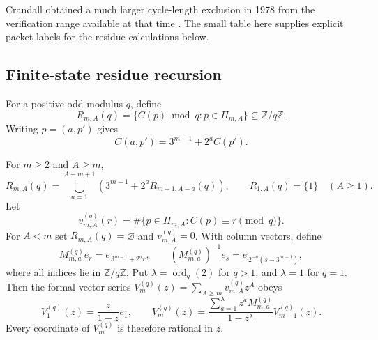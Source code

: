 \begin{remark}
Crandall obtained a much larger cycle-length exclusion in 1978 from the
verification range available at that time \cite[Theorem~7.3]{Crandall1978}.
The small table here supplies explicit packet labels for the residue
calculations below.
\end{remark}

\subsection{Finite-state residue recursion}

For a positive odd modulus $q$, define
\[
 R_{m,A}(q)=\{C(p)\bmod q:p\in\Pi_{m,A}\}
 \subseteq\mathbb Z/q\mathbb Z.
\]
Writing $p=(a,p')$ gives
\begin{equation}
 C(a,p')=3^{m-1}+2^aC(p').
 \label{eq:first-letter-C-recursion}
\end{equation}

\begin{theorem}
\label{thm:packet-residue-automaton}
For $m\ge2$ and $A\ge m$,
\begin{equation}
 R_{m,A}(q)=
 \bigcup_{a=1}^{A-m+1}
 \left(3^{m-1}+2^aR_{m-1,A-a}(q)\right),
 \qquad R_{1,A}(q)=\{\bar1\}\quad(A\ge1).
 \label{eq:packet-residue-recursion}
\end{equation}
Let
\[
 v_{m,A}^{(q)}(r)=
 \#\{p\in\Pi_{m,A}:C(p)\equiv r\pmod q\}.
\]
For $A<m$ set $R_{m,A}(q)=\varnothing$ and $v_{m,A}^{(q)}=0$.
With column vectors, define
\[
 M_{m,a}^{(q)}e_r=e_{\,3^{m-1}+2^ar},\qquad
 (M_{m,a}^{(q)})^{-1}e_s=e_{\,2^{-a}(s-3^{m-1})},
\]
where all indices lie in $\mathbb Z/q\mathbb Z$.  Put
$\lambda=\operatorname{ord}_q(2)$ for $q>1$, and $\lambda=1$ for $q=1$.
Then the
formal vector series $V_m^{(q)}(z)=\sum_{A\ge m}v_{m,A}^{(q)}z^A$ obeys
\begin{equation}
 V_1^{(q)}(z)=\frac{z}{1-z}e_{\bar1},
 \qquad
 V_m^{(q)}(z)=
 \frac{\sum_{a=1}^{\lambda}z^aM_{m,a}^{(q)}}{1-z^{\lambda}}
 V_{m-1}^{(q)}(z).
 \label{eq:packet-residue-rational-series}
\end{equation}
Every coordinate of $V_m^{(q)}$ is therefore rational in $z$.
\end{theorem}

